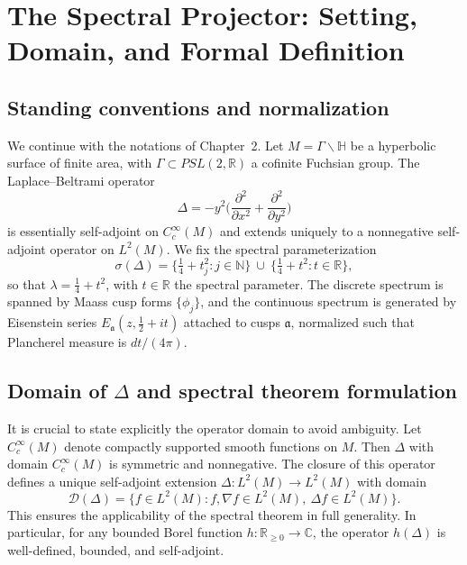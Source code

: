 
\section{The Spectral Projector: Setting, Domain, and Formal Definition}
\label{sec:spectral-projector-part1}

\subsection*{Standing conventions and normalization}

We continue with the notations of Chapter~2. 
Let $M=\Gamma\backslash\mathbb{H}$ be a hyperbolic surface of finite area, with $\Gamma\subset PSL(2,\mathbb{R})$ a cofinite Fuchsian group.  
The Laplace--Beltrami operator
\[
  \Delta = -y^2\Big(\frac{\partial^2}{\partial x^2} + \frac{\partial^2}{\partial y^2}\Big)
\]
is essentially self-adjoint on $C_c^\infty(M)$ and extends uniquely to a nonnegative self-adjoint operator on $L^2(M)$.  
We fix the spectral parameterization
\[
  \sigma(\Delta) = \Big\{\tfrac14+t_j^2 : j\in\mathbb{N}\Big\} \ \cup\ \Big\{\tfrac14+t^2 : t\in\mathbb{R}\Big\},
\]
so that $\lambda=\frac14+t^2$, with $t\in\mathbb{R}$ the spectral parameter.  
The discrete spectrum is spanned by Maass cusp forms $\{\phi_j\}$, and the continuous spectrum is generated by Eisenstein series $E_{\mathfrak{a}}(z,\tfrac12+it)$ attached to cusps $\mathfrak{a}$, normalized such that Plancherel measure is $dt/(4\pi)$.

\subsection*{Domain of $\Delta$ and spectral theorem formulation}

It is crucial to state explicitly the operator domain to avoid ambiguity.  
Let $C_c^\infty(M)$ denote compactly supported smooth functions on $M$.  
Then $\Delta$ with domain $C_c^\infty(M)$ is symmetric and nonnegative.  
The closure of this operator defines a unique self-adjoint extension $\Delta:L^2(M)\to L^2(M)$ with domain
\[
  \mathcal{D}(\Delta) = \big\{f\in L^2(M): f,\nabla f\in L^2(M),\ \Delta f\in L^2(M)\big\}.
\]
This ensures the applicability of the spectral theorem in full generality.  
In particular, for any bounded Borel function $h:\mathbb{R}_{\ge0}\to\mathbb{C}$, the operator $h(\Delta)$ is well-defined, bounded, and self-adjoint.

